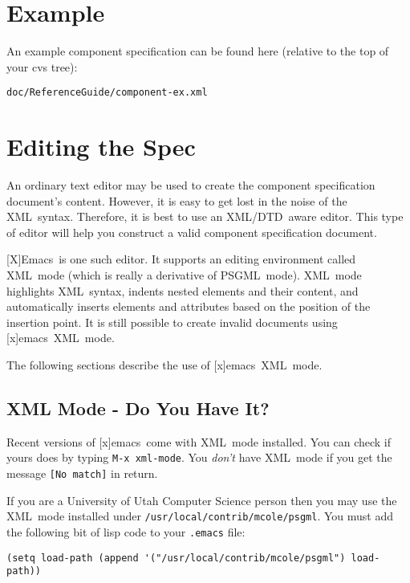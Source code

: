 \documentclass{article}
\newcommand{\acronym}[1]{#1}
\newcommand{\filename}[1]{\texttt{#1}}
\newcommand{\xml}{\acronym{XML}}
\newcommand{\Xml}{\xml}
\newcommand{\psgml}{\acronym{PSGML}}
\newcommand{\dtd}{\acronym{DTD}}
\newcommand{\emacs}{[x]emacs}
\newcommand{\Emacs}{[X]Emacs}
\newcommand{\keyboard}[1]{\texttt{#1}}
\newcommand{\screen}[1]{\texttt{#1}}
\newcommand{\SECexample}{Example}
\newcommand{\SECediting}{Editing the Spec}
\newcommand{\SUBSECgettingSources}{XML Mode - Do You Have It?}
\begin{document}
\section{\SECexample}
\label{\SECexample}

An example component specification can be found here (relative to the top
of your cvs tree):

\begin{verbatim}
doc/ReferenceGuide/component-ex.xml
\end{verbatim}

\section{\SECediting}
\label{\SECediting}

An ordinary text editor may be used to create the component specification
document's content.  However, it is easy to get lost in the noise of the
\xml\ syntax.  Therefore, it is best to use an \xml{}/\dtd\ aware editor.
This type of editor will help you construct a valid component specification
document.

\Emacs\ is one such editor.  It supports an editing environment called
\xml\ mode (which is really a derivative of \psgml\ mode).  \Xml\ mode
highlights \xml\ syntax, indents nested elements and their content, and
automatically inserts elements and attributes based on the position of the
insertion point.  It is still possible to create invalid documents using
\emacs\ \xml\ mode.

The following sections describe the use of \emacs\ \xml\ mode.

\subsection{\SUBSECgettingSources}
\label{\SUBSECgettingSources}

Recent versions of \emacs\ come with \xml\ mode installed.  You can check
if yours does by typing \keyboard{M-x xml-mode}.  You \emph{don't} have
\xml\ mode if you get the message
\screen{[No match]} in return.

If you are a University of Utah Computer Science person then you may use
the \xml\ mode installed under \filename{/usr/local/contrib/mcole/psgml}.
You must add the following bit of lisp code to your \filename{.emacs} file:

\begin{verbatim}
(setq load-path (append '("/usr/local/contrib/mcole/psgml") load-path))
\end{verbatim}
\end{document}
